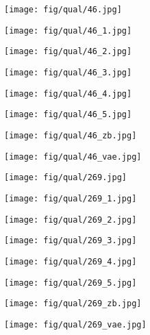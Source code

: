\documentclass[10pt,twocolumn,letterpaper]{article}
\newcommand{\sze}{0.13}
\newcommand{\szle}{0.08}
\begin{document}
\begin{figure*}[h]
\begin{subfigure}[c]{\sze\linewidth}
\texttt{[image: fig/qual/46.jpg]}
\end{subfigure}
\begin{subfigure}[c]{\sze\linewidth}
\texttt{[image: fig/qual/46\_1.jpg]}
\end{subfigure}
\begin{subfigure}[c]{\sze\linewidth}
\texttt{[image: fig/qual/46\_2.jpg]}
\end{subfigure}
\begin{subfigure}[c]{\sze\linewidth}
\texttt{[image: fig/qual/46\_3.jpg]}
\end{subfigure}
\begin{subfigure}[c]{\sze\linewidth}
\texttt{[image: fig/qual/46\_4.jpg]}
\end{subfigure}
\hspace{3pt}
\begin{subfigure}[c]{\sze\linewidth}
\texttt{[image: fig/qual/46\_5.jpg]}
\end{subfigure}
\begin{subfigure}[c]{\szle\linewidth}
\texttt{[image: fig/qual/46\_zb.jpg]}
\end{subfigure}
\hspace{3pt}
\begin{subfigure}[c]{\szle\linewidth}
\texttt{[image: fig/qual/46\_vae.jpg]}
\end{subfigure}

\begin{subfigure}[c]{\sze\linewidth}
\texttt{[image: fig/qual/269.jpg]}
\end{subfigure}
\begin{subfigure}[c]{\sze\linewidth}
\texttt{[image: fig/qual/269\_1.jpg]}
\end{subfigure}
\begin{subfigure}[c]{\sze\linewidth}
\texttt{[image: fig/qual/269\_2.jpg]}
\end{subfigure}
\begin{subfigure}[c]{\sze\linewidth}
\texttt{[image: fig/qual/269\_3.jpg]}
\end{subfigure}
\begin{subfigure}[c]{\sze\linewidth}
\texttt{[image: fig/qual/269\_4.jpg]}
\end{subfigure}
\hspace{3pt}
\begin{subfigure}[c]{\sze\linewidth}
\texttt{[image: fig/qual/269\_5.jpg]}
\end{subfigure}
\begin{subfigure}[c]{\szle\linewidth}
\texttt{[image: fig/qual/269\_zb.jpg]}
\end{subfigure}
\hspace{3pt}
\begin{subfigure}[c]{\szle\linewidth}
\texttt{[image: fig/qual/269\_vae.jpg]}
\end{subfigure}


\end{figure*}
\end{document}
